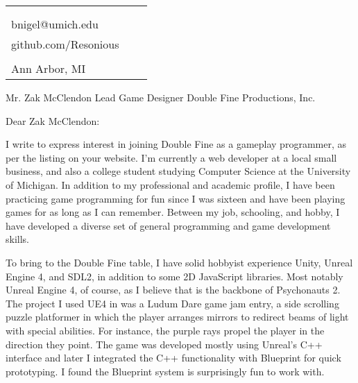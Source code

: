 \documentclass[12pt]{article}
\makeatletter
\def \address{2287 S. Main St.\\Ann Arbor, MI}
\def \author{Nigel Baillie}
\def \email{bnigel@umich.edu}
\def \phonenumber{(734) 678-5328}
\def \bday{Born April $11^{\text{th}}$ 1995}
\def \github{github.com/Resonious}
\makeatother
\begin{document}
\newlength{\rcollength}\setlength{\rcollength}{3.0in}%
\begin{tabular} {
  p{}
  p{}
  p{}
}
  \begin{flushleft}
    {\Huge{\author}}\\
    \vspace{1.5 mm}
  \end{flushleft}
  &
  \begin{center}
    {\phonenumber}\\
    {\email}\\
    {\github}
  \end{center}
  &
  \begin{flushright}
    {\bday}\\
    {\address}
  \end{flushright}
\end{tabular}

Mr. Zak McClendon
\newline
Lead Game Designer
\newline
Double Fine Productions, Inc.
\newline

Dear Zak McClendon:
\newline

I write to express interest in joining Double Fine as a gameplay programmer,
as per the listing on your website.
I'm currently a web developer at a local small business, and also a college
student studying Computer Science at the University of Michigan. In addition
to my professional and academic profile, I have been practicing game programming
for fun since I was sixteen and have been playing games for as long as I can
remember. Between my job, schooling, and hobby, I have developed a diverse
set of general programming and game development skills.
\newline

To bring to the Double Fine table, I have solid hobbyist experience Unity,
Unreal Engine 4, and SDL2, in addition to some 2D JavaScript libraries.
Most notably Unreal Engine 4, of course, as I believe that is the backbone of
Psychonauts 2. The project I used UE4 in was a Ludum Dare game jam
entry, a side scrolling puzzle platformer in which the player arranges
mirrors to redirect beams of light with special abilities. For instance,
the purple rays propel the player in the direction they point. The game
was developed mostly using Unreal's C++ interface and later I integrated
the C++ functionality with Blueprint for quick prototyping. I found the Blueprint
system is surprisingly fun to work with.
\newline
\end{document}
